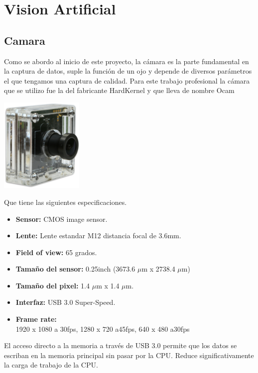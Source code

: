 \chapter{Vision Artificial}

\section{Camara}
Como se abordo al inicio de este proyecto, la cámara es la parte fundamental en
la captura de datos, suple la función de un ojo y depende de diversos
parámetros el que tengamos una captura de calidad. Para este trabajo profesional
la cámara que se utilizo fue la del fabricante HardKernel y que lleva de nombre
Ocam
\begin{center}
    \includegraphics[width=0.3\textwidth]{Capitulo4/Fig0_1.eps}       
    \label{Fig1}
\end{center}
Que tiene las siguientes especificaciones.
\begin{itemize}
    \item \textbf{Sensor:} CMOS image sensor.
    \item \textbf{Lente: } Lente estandar M12 distancia focal de 3.6mm.
    \item \textbf{Field of view: } 65 grados.
    \item \textbf{Tamaño del sensor: }0.25inch (3673.6 $\mu$m x 2738.4 $\mu$m)
    \item \textbf{Tamaño del pixel: } 1.4 $\mu$m x 1.4 $\mu$m.
    \item \textbf{Interfaz: }USB 3.0 Super-Speed.
    \item \textbf{Frame rate: }\\
    1920 x 1080 a 30fps, 1280 x 720 a45fps, 640 x 480 a30fps
\end{itemize}
El acceso directo a la memoria a través de USB 3.0 permite que los datos se 
escriban en la memoria principal sin pasar por la CPU. Reduce significativamente 
la carga de trabajo de la CPU.

